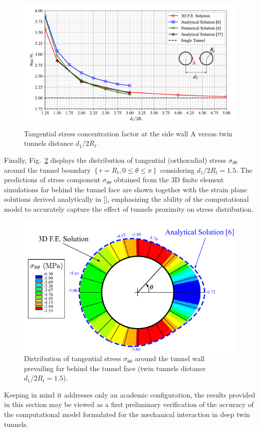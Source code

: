 \documentclass[a4paper,fleqn]{cas-sc}
\begin{document}
\begin{figure}[h!]
	\centering
	\includegraphics[scale=0.65]{Tangencial stress concentration factor in A.pdf}
	\caption{Tangential stress concentration factor at the side wall A versus twin tunnels distance $d_1/2R_t$.}
	\label{Tangencial stress concentration factor in A}
\end{figure}
\FloatBarrier

Finally, Fig.~\ref{GUO_FIG1} displays the distribution of tangential (orthoradial) stress $\sigma_{\theta \theta}$ around the tunnel boundary $\left\{r = R_t, 0 \le \theta \le \pi\right\}$ considering $d_1/2R_t = 1.5$. The predictions of stress component $\sigma_{\theta \theta}$ obtained from the 3D finite element simulations far behind the tunnel face are shown together with the strain plane solutions derived analytically in [], emphasizing the ability of the computational model to accurately capture the effect of tunnels proximity on stress distribution.

\begin{figure}[h!]
	\centering
	\includegraphics[scale=1]{GUO_FIG1.pdf}
	\caption{Distribution of tangential stress $\sigma_{\theta \theta}$ around the tunnel wall  prevailing far behind the tunnel face (twin tunnels distance $d_1/2R_t = 1.5$).}
	\label{GUO_FIG1}
\end{figure}
\FloatBarrier
Keeping in mind it addresses only an academic configuration, the results provided in this section may be viewed as a first preliminary verification of the accuracy of the computational model formulated for the mechanical interaction in deep twin tunnels.
\end{document}
